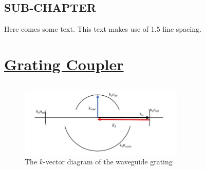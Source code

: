 \documentclass[fontsize=11pt]{scrartcl}
\begin{document}
\subsection{SUB-CHAPTER}
Here comes some text. This text makes use of 1.5 line spacing. 
\pagebreak
\section{\uline{Grating Coupler}}
\subsection{}
\begin{figure}[H]
    \centering
     \includegraphics[width=0.7\textwidth]{img/fig3.1.jpg}
     \caption{The $k$-vector diagram of the waveguide grating}
     \label{fig3.1}
\end{figure}
\end{document}
